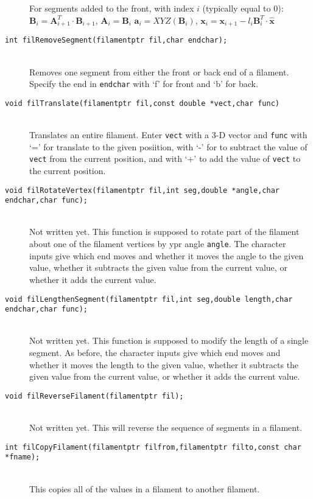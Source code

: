 \documentclass {scrbook}
\newcommand {\ttt} {\texttt}
\begin{document}
\begin{description}
For segments added to the front, with index $i$ (typically equal to 0):
$\mathbf{B}_i = \mathbf{A}_{i+1}^T \cdot \mathbf{B}_{i+1}$,
$\mathbf{A}_i = \mathbf{B}_i$
$\mathbf{a}_i = XYZ(\mathbf{B}_i)$,
$\mathbf{x}_i = \mathbf{x}_{i+1} - l_i \mathbf{B}^T_i \cdot \mathbf{\hat{x}}$

\item[\ttt{int filRemoveSegment(filamentptr fil,char endchar);}]
\hfill \\
Removes one segment from either the front or back end of a filament. Specify the end in \ttt{endchar} with `f' for front and `b' for back.

\item[\ttt{void filTranslate(filamentptr fil,const double *vect,char func)}]
\hfill \\
Translates an entire filament. Enter \ttt{vect} with a 3-D vector and \ttt{func} with `=' for translate to the given posiition, with `-' for to subtract the value of \ttt{vect} from the current position, and with `+' to add the value of \ttt{vect} to the current position.

\item[\ttt{void filRotateVertex(filamentptr fil,int seg,double *angle,char endchar,char func);}]
\hfill \\
Not written yet. This function is supposed to rotate part of the filament about one of the filament vertices by ypr angle \ttt{angle}. The character inputs give which end moves and whether it moves the angle to the given value, whether it subtracts the given value from the current value, or whether it adds the current value.

\item[\ttt{void filLengthenSegment(filamentptr fil,int seg,double length,char endchar,char func);}]
\hfill \\
Not written yet. This function is supposed to modify the length of a single segment. As before, the character inputs give which end moves and whether it moves the length to the given value, whether it subtracts the given value from the current value, or whether it adds the current value.

\item[\ttt{void filReverseFilament(filamentptr fil);}]
\hfill \\
Not written yet. This will reverse the sequence of segments in a filament.

\item[\ttt{int filCopyFilament(filamentptr filfrom,filamentptr filto,const char *fname);}]
\hfill \\
This copies all of the values in a filament to another filament.


\end{description}
\end{document}
